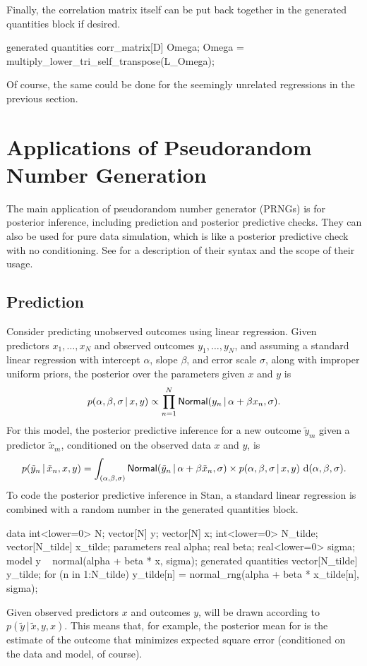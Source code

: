 Finally, the correlation matrix itself can be put back together in the
generated quantities block if desired.
%
\begin{stancode}
generated quantities {
  corr_matrix[D] Omega;
  Omega = multiply_lower_tri_self_transpose(L_Omega);
}
\end{stancode}
%
Of course, the same could be done for the seemingly unrelated
regressions in the previous section.

\section{Applications of Pseudorandom Number Generation}

The main application of pseudorandom number generator (PRNGs) is for
posterior inference, including prediction and posterior predictive
checks.  They can also be used for pure data simulation, which is like
a posterior predictive check with no conditioning.  See
 for a description of their syntax and
the scope of their usage.

\subsection{Prediction}

Consider predicting unobserved outcomes using linear
regression.  Given predictors $x_1, \ldots, x_N$ and observed outcomes
$y_1,\ldots,y_N$, and assuming a standard linear regression with
intercept $\alpha$, slope $\beta$, and error scale $\sigma$, along with
improper uniform priors, the posterior over the parameters given $x$
and $y$ is
%
\[
p(\alpha, \beta, \sigma \, | \, x, y)
\propto
\prod_{n=1}^N
  \mbox{\sf Normal}(y_n \, | \, \alpha + \beta x_n, \sigma).
\]
%
For this model, the posterior predictive inference for a new outcome
$\tilde{y}_m$ given a predictor $\tilde{x}_m$, conditioned on the
observed data $x$ and $y$, is
\[
p(\tilde{y}_n \, | \, \tilde{x}_n, x, y)
= \int_{(\alpha,\beta,\sigma)}
  \mbox{\sf Normal}(\tilde{y}_n \, | \, \alpha + \beta \tilde{x}_n, \sigma)
  \times
  p(\alpha, \beta, \sigma \, | \, x, y)
  \
  \mathrm{d}(\alpha,\beta,\sigma).
\]
%
To code the posterior predictive inference in Stan, a standard linear
regression is combined with a random number in the generated
quantities block.
%
\begin{stancode}
data {
  int<lower=0> N;
  vector[N] y;
  vector[N] x;
  int<lower=0> N_tilde;
  vector[N_tilde] x_tilde;
}
parameters {
  real alpha;
  real beta;
  real<lower=0> sigma;
}
model {
  y ~ normal(alpha + beta * x, sigma);
}
generated quantities {
  vector[N_tilde] y_tilde;
  for (n in 1:N_tilde)
    y_tilde[n] = normal_rng(alpha + beta * x_tilde[n], sigma);
}
\end{stancode}
%
Given observed predictors $x$ and outcomes $y$,  will
be drawn according to $p(\tilde{y} \, | \, \tilde{x}, y, x)$.  This
means that, for example, the posterior mean for \code{y\_tilde} is the
estimate of the outcome that minimizes expected square error
(conditioned on the data and model, of course).

